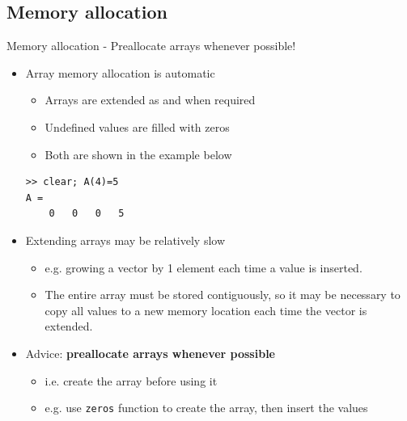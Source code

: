 \documentclass{beamer}
\begin{document}
\subsection{Memory allocation}
\begin{frame}[fragile]{Memory allocation - Preallocate arrays whenever possible!}{}
	\begin{itemize}
		\item Array memory allocation is automatic
		\begin{itemize}
			\item Arrays are extended as and when required
			\item Undefined values are filled with zeros
			\item Both are shown in the example below
		\end{itemize}
		
		\begin{lstlisting}[style=Matlab-editor]
>> clear; A(4)=5
A = 
	0	0	0	5
		\end{lstlisting}		
		\item Extending arrays may be relatively slow
		\begin{itemize}
			\item e.g. growing a vector by 1 element each time a value is inserted.
			\item The entire array must be stored contiguously, so it may be necessary to copy
			all values to a new memory location each time the vector is extended.
		\end{itemize}

		\item Advice: \textbf{preallocate arrays whenever possible}
		\begin{itemize}
			\item i.e. create the array before using it
			\item e.g. use \texttt{zeros} function to create the array, then insert the values
		\end{itemize}
	\end{itemize}
\end{frame}
\end{document}
